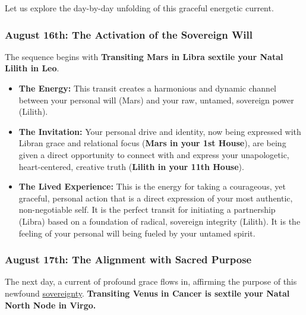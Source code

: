 \documentclass{article}
\begin{document}
Let us explore the day-by-day unfolding of this graceful energetic current.

\subsubsection*{August 16th: The Activation of the Sovereign Will}\label{august-16th-the-activation-of-the-sovereign-will}

The sequence begins with \textbf{Transiting Mars in Libra sextile your Natal Lilith in Leo}.

\begin{itemize}
\item
  \textbf{The Energy:} This transit creates a harmonious and dynamic channel between your personal will (Mars) and your raw, untamed, sovereign power (Lilith).
\item
  \textbf{The Invitation:} Your personal drive and identity, now being expressed with Libran grace and relational focus (\textbf{Mars in your 1st House}), are being given a direct opportunity to connect with and express your unapologetic, heart-centered, creative truth (\textbf{Lilith in your 11th House}).
\item
  \textbf{The Lived Experience:} This is the energy for taking a courageous, yet graceful, personal action that is a direct expression of your most authentic, non-negotiable self. It is the perfect transit for initiating a partnership (Libra) based on a foundation of radical, sovereign integrity (Lilith). It is the feeling of your personal will being fueled by your untamed spirit.
\end{itemize}

\subsubsection*{August 17th: The Alignment with Sacred Purpose}\label{august-17th-the-alignment-with-sacred-purpose}

The next day, a current of profound grace flows in, affirming the purpose of this newfound \hyperlink{gloss:sovereignty}{sovereignty}. \textbf{Transiting Venus in Cancer is sextile your Natal North Node in Virgo.}
\end{document}
